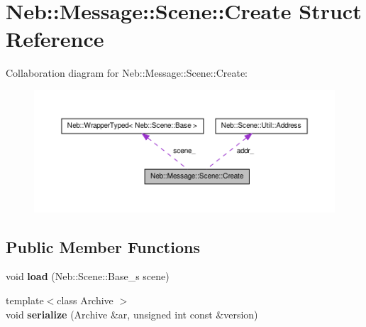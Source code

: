 \hypertarget{structNeb_1_1Message_1_1Scene_1_1Create}{\section{\-Neb\-:\-:\-Message\-:\-:\-Scene\-:\-:\-Create \-Struct \-Reference}
\label{structNeb_1_1Message_1_1Scene_1_1Create}
}


\-Collaboration diagram for \-Neb\-:\-:\-Message\-:\-:\-Scene\-:\-:\-Create\-:\nopagebreak
\begin{figure}[H]
\begin{center}
\leavevmode
\includegraphics[width=350pt]{structNeb_1_1Message_1_1Scene_1_1Create__coll__graph}
\end{center}
\end{figure}
\subsection*{\-Public \-Member \-Functions}
\begin{DoxyCompactItemize}
\item 
\hypertarget{structNeb_1_1Message_1_1Scene_1_1Create_aa143080420fdc933e59d4a20eea745bb}{void {\bfseries load} (\-Neb\-::\-Scene\-::\-Base\-\_\-s scene)}\label{structNeb_1_1Message_1_1Scene_1_1Create_aa143080420fdc933e59d4a20eea745bb}

\item 
\hypertarget{structNeb_1_1Message_1_1Scene_1_1Create_ab128d0e116d07b1034ef8f25adcfa4ac}{{\footnotesize template$<$class Archive $>$ }\\void {\bfseries serialize} (\-Archive \&ar, unsigned int const \&version)}\label{structNeb_1_1Message_1_1Scene_1_1Create_ab128d0e116d07b1034ef8f25adcfa4ac}

\end{DoxyCompactItemize}
